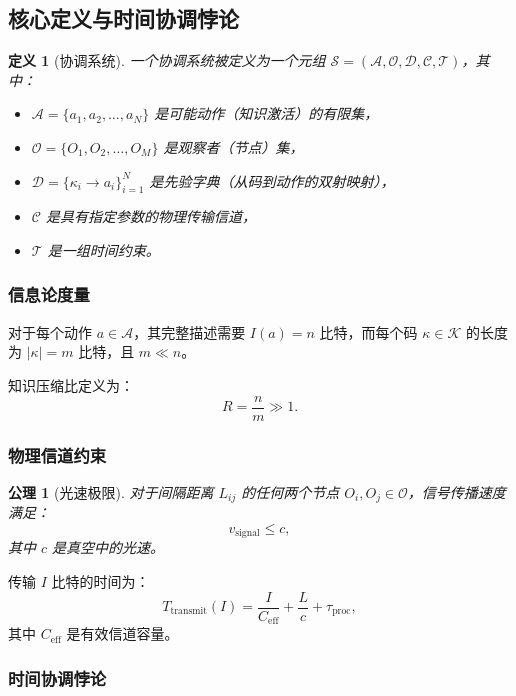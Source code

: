 \documentclass[11pt,a4paper]{article}
\newtheorem{axiom}{公理}
\newtheorem{definition}{定义}
\begin{document}
	\subsection{核心定义与时间协调悖论}
	
	\begin{definition}[协调系统]
		一个协调系统被定义为一个元组 $\mathcal{S} = (\mathcal{A}, \mathcal{O}, \mathcal{D}, \mathcal{C}, \mathcal{T})$，其中：
		\begin{itemize}
			\item $\mathcal{A} = \{a_1, a_2, \dots, a_N\}$ 是可能动作（知识激活）的有限集，
			\item $\mathcal{O} = \{O_1, O_2, \dots, O_M\}$ 是观察者（节点）集，
			\item $\mathcal{D} = \{\kappa_i \to a_i\}_{i=1}^N$ 是先验字典（从码到动作的双射映射），
			\item $\mathcal{C}$ 是具有指定参数的物理传输信道，
			\item $\mathcal{T}$ 是一组时间约束。
		\end{itemize}
	\end{definition}
	
	\subsubsection{信息论度量}
	
	对于每个动作 $a \in \mathcal{A}$，其完整描述需要 $I(a) = n$ 比特，而每个码 $\kappa \in \mathcal{K}$ 的长度为 $|\kappa| = m$ 比特，且 $m \ll n$。
	
	知识压缩比定义为：
	\[
	R = \frac{n}{m} \gg 1.
	\]
	
	\subsubsection{物理信道约束}
	
	\begin{axiom}[光速极限]
		对于间隔距离 $L_{ij}$ 的任何两个节点 $O_i, O_j \in \mathcal{O}$，信号传播速度满足：
		\[
		v_{\text{signal}} \leq c,
		\]
		其中 $c$ 是真空中的光速。
	\end{axiom}
	
	传输 $I$ 比特的时间为：
	\[
	T_{\text{transmit}}(I) = \frac{I}{C_{\text{eff}}} + \frac{L}{c} + \tau_{\text{proc}},
	\]
	其中 $C_{\text{eff}}$ 是有效信道容量。
	
	\subsubsection{时间协调悖论}
	
\end{document}

